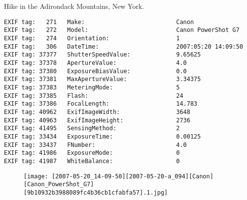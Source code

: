 \section{\protect{}}
\noindent Hike in the Adirondack Mountains, New York.
\noindent
\begin{lstlisting}
EXIF tag:   271   Make:                          Canon
EXIF tag:   272   Model:                         Canon PowerShot G7
EXIF tag:   274   Orientation:                   1
EXIF tag:   306   DateTime:                      2007:05:20 14:09:50
EXIF tag: 37377   ShutterSpeedValue:             9.65625
EXIF tag: 37378   ApertureValue:                 4.0
EXIF tag: 37380   ExposureBiasValue:             0.0
EXIF tag: 37381   MaxApertureValue:              3.34375
EXIF tag: 37383   MeteringMode:                  5
EXIF tag: 37385   Flash:                         24
EXIF tag: 37386   FocalLength:                   14.783
EXIF tag: 40962   ExifImageWidth:                3648
EXIF tag: 40963   ExifImageHeight:               2736
EXIF tag: 41495   SensingMethod:                 2
EXIF tag: 33434   ExposureTime:                  0.00125
EXIF tag: 33437   FNumber:                       4.0
EXIF tag: 41986   ExposureMode:                  0
EXIF tag: 41987   WhiteBalance:                  0

\end{lstlisting}
\clearpage
\begin{figure}
\raggedleft
\texttt{[image: [2007-05-20\_14-09-50][2007-05-20-a\_094][Canon][Canon\_PowerShot\_G7][9b10932b3988089fc4b36cb1cfabfa57].1.jpg]}
\end{figure}


\clearpage
